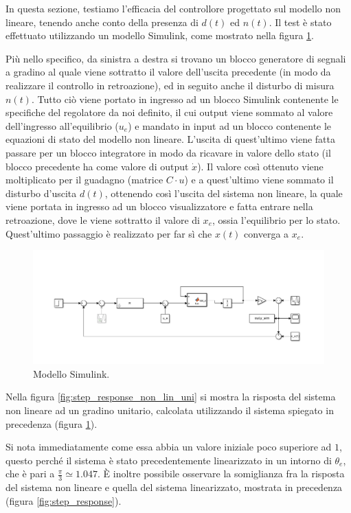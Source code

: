 \documentclass[a4paper, 11pt]{article}
\begin{document}
In questa sezione, testiamo l'efficacia del controllore progettato sul modello non lineare, tenendo anche conto della presenza di $d(t)$ ed $n(t)$. 
Il test \`e stato effettuato utilizzando un modello Simulink, come mostrato nella figura \ref*{fig:simulink}.

Pi\`u nello specifico,
da sinistra a destra si trovano un blocco generatore di segnali a gradino al quale viene sottratto il valore dell'uscita precedente (in modo da realizzare il controllo in retroazione), ed in seguito anche il disturbo di misura $n(t)$. 
Tutto ci\`o viene portato in ingresso ad un blocco Simulink contenente le specifiche del regolatore da noi definito, il cui output viene sommato al valore dell'ingresso all'equilibrio ($u_e$) e mandato in input ad un blocco contenente
le equazioni di stato del modello non lineare. L'uscita di quest'ultimo viene fatta passare per un blocco integratore in modo da ricavare in valore dello stato (il blocco precedente ha come valore di output $\dot{x}$). Il valore cos\`i ottenuto 
viene moltiplicato per il guadagno (matrice $C\cdot u$) e a quest'ultimo viene sommato il disturbo d'uscita $d(t)$, ottenendo cos\`i l'uscita del sistema non lineare, la quale viene portata in ingresso ad un blocco visualizzatore e fatta entrare nella retroazione,
dove le viene sottratto il valore di $x_e$, ossia l'equilibrio per lo stato. Quest'ultimo passaggio è realizzato per far sì che $x(t)$ converga a $x_e$.


\begin{figure}[h!]
	\centering
	\includegraphics[width=0.75\linewidth]{./images/simulink1.png}
	\caption{Modello Simulink.}
	\label{fig:simulink}
\end{figure}

Nella figura \ref*{fig:step_response_non_lin_uni} si mostra la risposta del sistema non lineare ad un gradino unitario, calcolata utilizzando il sistema spiegato in precedenza (figura \ref*{fig:simulink}).

Si nota immediatamente come essa abbia un valore iniziale poco superiore ad $1$, questo perch\'e il sistema \`e stato precedentemente linearizzato in un intorno di $\theta_e$, che \`e pari a $\frac{\pi}{3} \simeq 1.047$.
\`E inoltre possibile osservare la somiglianza fra la risposta del sistema non lineare e quella del sistema linearizzato, mostrata in precedenza (figura \ref*{fig:step_response}).
\end{document}
